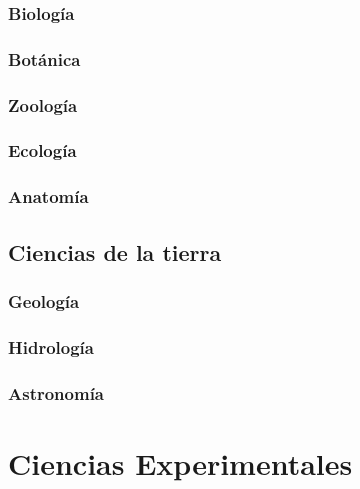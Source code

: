 \documentclass[
]{book}
\theoremstyle{definition}
\theoremstyle{definition}
\theoremstyle{definition}
\theoremstyle{definition}
\theoremstyle{remark}
\begin{document}
\hypertarget{biologuxeda}{%
\subsubsection{Biología}\label{biologuxeda}}

\hypertarget{botuxe1nica}{%
\subsubsection{Botánica}\label{botuxe1nica}}

\hypertarget{zoologuxeda}{%
\subsubsection{Zoología}\label{zoologuxeda}}

\hypertarget{ecologuxeda}{%
\subsubsection{Ecología}\label{ecologuxeda}}

\hypertarget{anatomuxeda}{%
\subsubsection{Anatomía}\label{anatomuxeda}}

\hypertarget{ciencias-de-la-tierra}{%
\subsection{Ciencias de la tierra}\label{ciencias-de-la-tierra}}

\hypertarget{geologuxeda}{%
\subsubsection{Geología}\label{geologuxeda}}

\hypertarget{hidrologuxeda}{%
\subsubsection{Hidrología}\label{hidrologuxeda}}

\hypertarget{astronomuxeda}{%
\subsubsection{Astronomía}\label{astronomuxeda}}

\hypertarget{ciencias-experimentales}{%
\section{Ciencias Experimentales}\label{ciencias-experimentales}}
\end{document}
